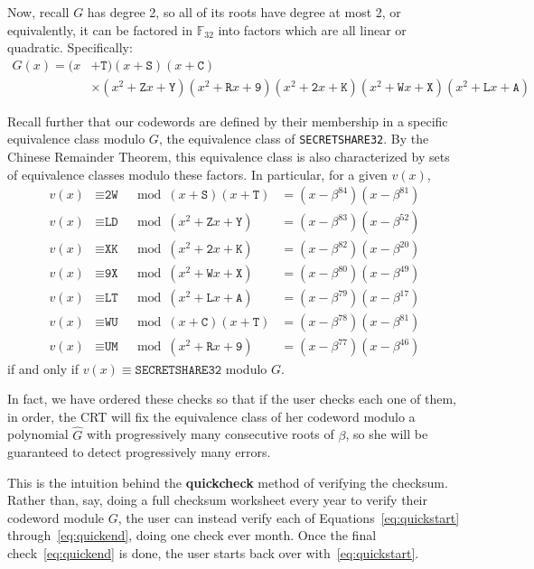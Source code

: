 \documentclass[letterpaper]{article}
\newcommand{\fttwo}{\mathbb{F}_{32}}
\newcommand{\vc}[1]{\texttt{#1}} %
\begin{document}
Now, recall $G$ has degree 2, so all of its roots have degree at most 2, or
equivalently, it can be factored in $\fttwo$ into factors which are all linear
or quadratic. Specifically:
\begin{align*}
G(x) = (x &+ \vc{T})(x + \vc{S})(x + \vc{C}) \\
    &\times (x^2 + \vc{Z}x + \vc{Y})(x^2 + \vc{R}x + \vc{9})
    (x^2 + \vc{2}x + \vc{K})(x^2 + \vc{W}x + \vc{X})(x^2 + \vc{L}x + \vc{A})
\end{align*}

Recall further that our codewords are defined by their membership in a specific
equivalence class modulo $G$, the equivalence class of \vc{SECRETSHARE32}. By
the Chinese Remainder Theorem, this equivalence class is also characterized by
sets of equivalence classes modulo these factors. In particular, for a given $v(x)$,
\begin{align}
v(x) &\equiv \vc{2W} \label{eq:quickstart}
  &\mod (x + \vc{S})(x + \vc{T})
  &= (x - \beta^{84})(x - \beta^{81}) \\
v(x) &\equiv \vc{LD}
  &\mod (x^2 + \vc{Z}x + \vc{Y})
  &= (x - \beta^{83})(x - \beta^{52}) \\
v(x) &\equiv \vc{XK}
  &\mod (x^2 + \vc{2}x + \vc{K})
  &= (x - \beta^{82})(x - \beta^{20}) \\
v(x) &\equiv \vc{9X}
  &\mod (x^2 + \vc{W}x + \vc{X})
  &= (x - \beta^{80})(x - \beta^{49}) \\
v(x) &\equiv \vc{LT}
  &\mod (x^2 + \vc{L}x + \vc{A})
  &= (x - \beta^{79})(x - \beta^{17}) \\
v(x) &\equiv \vc{WU}
  &\mod (x + \vc{C})(x + \vc{T})
  &= (x - \beta^{78})(x - \beta^{81}) \\
v(x) &\equiv \vc{UM} \label{eq:quickend}
  &\mod (x^2 + \vc{R}x + \vc{9})
  &= (x - \beta^{77})(x - \beta^{46})
\end{align}
if and only if $v(x)\equiv\vc{SECRETSHARE32}$ modulo $G$.

In fact, we have ordered these checks so that if the user checks each one of
them, in order, the CRT will fix the equivalence class of her codeword modulo
a polynomial $\hat{G}$ with progressively many consecutive roots of $\beta$,
so she will be guaranteed to detect progressively many errors.

This is the intuition behind the \textbf{quickcheck} method of verifying the
checksum. Rather than, say, doing a full checksum worksheet every year to verify
their codeword module $G$, the user can instead verify each of
Equations~\eqref{eq:quickstart} through~\eqref{eq:quickend}, doing one check
ever month. Once the final check~\eqref{eq:quickend} is done, the user starts
back over with~\eqref{eq:quickstart}.
\end{document}

